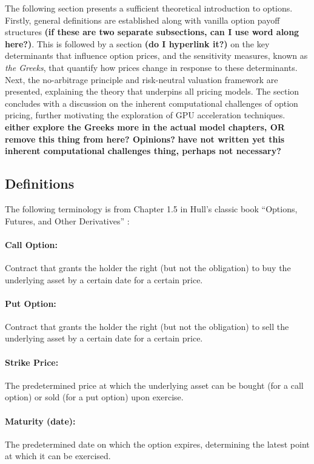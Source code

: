 \documentclass[english,12pt,a4paper,pdftex,sci,utf8]{aaltothesis}
\begin{document}
The following section presents a sufficient theoretical introduction to options. Firstly, general definitions are established along with vanilla option payoff structures \textbf{(if these are two separate subsections, can I use word along here?)}. This is followed by a section \textbf{(do I hyperlink it?)} on the key determinants that influence option prices, and the sensitivity measures, known as \emph{the Greeks}, that quantify how prices change in response to these determinants. Next, the no-arbitrage principle and risk-neutral valuation framework are presented, explaining the theory that underpins all pricing models. The section concludes with a discussion on the inherent computational challenges of option pricing, further motivating the exploration of GPU acceleration techniques. \textbf{either explore the Greeks more in the actual model chapters, OR remove this thing from here? Opinions?} \textbf{have not written yet this inherent computational challenges thing, perhaps not necessary?}


\subsection{Definitions}
The following terminology is from Chapter 1.5 in Hull's classic book ``Options, Futures, and Other Derivatives'' \cite{hull2016options}:

\paragraph{Call Option:}Contract that grants the holder the right (but not the obligation) to buy the underlying asset by a certain date for a certain price.

\paragraph{Put Option:}Contract that grants the holder the right (but not the obligation) to sell the underlying asset by a certain date for a certain price.

\paragraph{Strike Price:}The predetermined price at which the underlying asset can be bought (for a call option) or sold (for a put option) upon exercise.

\paragraph{Maturity (date):}The predetermined date on which the option expires, determining the latest point at which it can be exercised.
\bigskip
\end{document}
